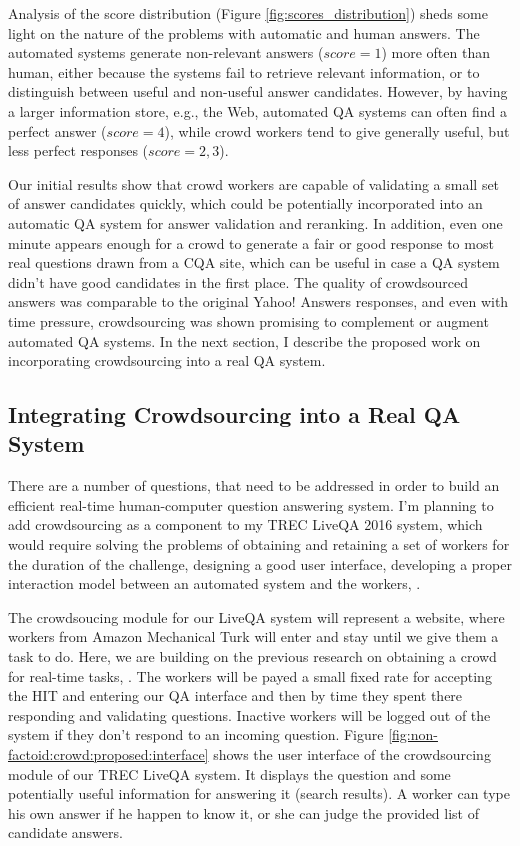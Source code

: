 Analysis of the score distribution (Figure \ref{fig:scores_distribution}) sheds some light on the nature of the problems with automatic and human answers.
The automated systems generate non-relevant answers ($score=1$) more often than human, either because the systems fail to retrieve relevant information, or to distinguish between useful and non-useful answer candidates.
However, by having a larger information store, e.g., the Web, automated QA systems can often find a perfect answer ($score=4$), while crowd workers tend to give generally useful, but less perfect responses ($score=2,3$).

Our initial results show that crowd workers are capable of validating a small set of answer candidates quickly, which could be potentially incorporated into an automatic QA system for answer validation and reranking.
In addition, even one minute appears enough for a crowd to generate a fair or good response to most real questions drawn from a CQA site, which can be useful in case a QA system didn't have good candidates in the first place.
The quality of crowdsourced answers was comparable to the original Yahoo! Answers responses, and even with time pressure, crowdsourcing was shown promising to complement or augment automated QA systems.
In the next section, I describe the proposed work on incorporating crowdsourcing into a real QA system.

\subsection{Integrating Crowdsourcing into a Real QA System}
\label{sec:non-factoid:crowd:integrating}

There are a number of questions, that need to be addressed in order to build an efficient real-time human-computer question answering system.
I'm planning to add crowdsourcing as a component to my TREC LiveQA 2016 system, which would require solving the problems of obtaining and retaining a set of workers for the duration of the challenge, designing a good user interface, developing a proper interaction model between an automated system and the workers, \etc.

The crowdsoucing module for our LiveQA system will represent a website, where workers from Amazon Mechanical Turk will enter and stay until we give them a task to do.
Here, we are building on the previous research on obtaining a crowd for real-time tasks, \eg \cite{bernstein2011crowds}.
The workers will be payed a small fixed rate for accepting the HIT and entering our QA interface and then by time they spent there responding and validating questions.
Inactive workers will be logged out of the system if they don't respond to an incoming question.
Figure \ref{fig:non-factoid:crowd:proposed:interface} shows the user interface of the crowdsourcing module of our TREC LiveQA system.
It displays the question and some potentially useful information for answering it (\eg search results).
A worker can type his own answer if he happen to know it, or she can judge the provided list of candidate answers.

